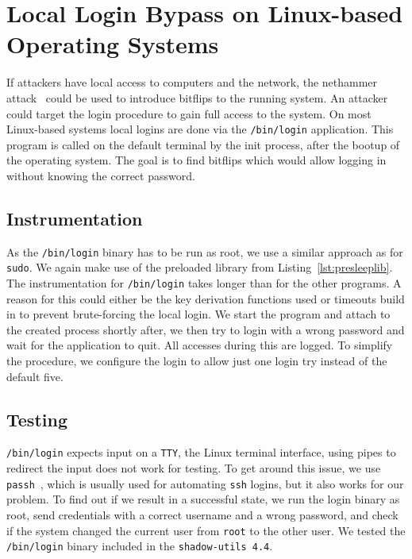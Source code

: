 \section{Local Login Bypass on Linux-based Operating Systems}

If attackers have local access to computers and the network, the nethammer
attack~\cite{nethammer} could be used to introduce bitflips to the running
system. An attacker could target the login procedure to gain full access to the
system. On most Linux-based systems local logins are done via the
\texttt{/bin/login} application. This program is called on the default terminal
by the init process, after the bootup of the operating system. The goal is to
find bitflips which would allow logging in without knowing the correct password.

\subsection{Instrumentation}

As the \texttt{/bin/login} binary has to be run as root, we use a similar
approach as for \texttt{sudo}. We again make use of the preloaded library from
Listing~\ref{lst:presleeplib}. The instrumentation for \texttt{/bin/login} takes
longer than for the other programs. A reason for this could either be the key
derivation functions used or timeouts build in to prevent brute-forcing the
local login. We start the program and attach to the created process shortly
after, we then try to login with a wrong password and wait for the application
to quit. All accesses during this are logged. To simplify the procedure, we
configure the login to allow just one login try instead of the default five.

\subsection{Testing}

\texttt{/bin/login} expects input on a \texttt{TTY}, the Linux terminal
interface, using pipes to redirect the input does not work for testing. To get
around this issue, we use \texttt{passh}~\cite{passhweb}, which is usually used
for automating \texttt{ssh} logins, but it also works for our problem. To find
out if we result in a successful state, we run the login binary as root, send
credentials with a correct username and a wrong password, and check if the
system changed the current user from \texttt{root} to the other user. We tested
the \texttt{/bin/login} binary included in the \texttt{shadow-utils 4.4}.

